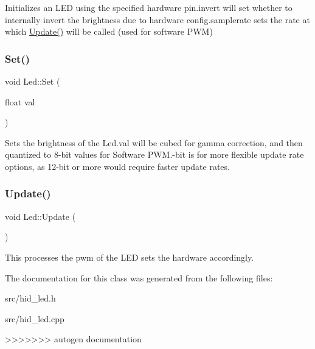 Initializes an L\+ED using the specified hardware pin.\+invert will set whether to internally invert the brightness due to hardware config.\+samplerate sets the rate at which \textquotesingle{}\hyperlink{classdaisy_1_1_led_ae8cbdb3e29cdc4f1f2aa50d7ce470fc9}{Update()}\textquotesingle{} will be called (used for software P\+WM) \mbox{\label{classdaisy_1_1_led_a007d36b37dee07e43b65789f1501b628}} 
\subsubsection{\texorpdfstring{Set()}{Set()}}
{\footnotesize\ttfamily void Led\+::\+Set (\begin{DoxyParamCaption}\item[{float}]{val }\end{DoxyParamCaption})}

Sets the brightness of the Led.\+val will be cubed for gamma correction, and then quantized to 8-\/bit values for Software P\+W\+M.-\/bit is for more flexible update rate options, as 12-\/bit or more would require faster update rates. \mbox{\label{classdaisy_1_1_led_ae8cbdb3e29cdc4f1f2aa50d7ce470fc9}} 
\subsubsection{\texorpdfstring{Update()}{Update()}}
{\footnotesize\ttfamily void Led\+::\+Update (\begin{DoxyParamCaption}{ }\end{DoxyParamCaption})}

This processes the pwm of the L\+ED sets the hardware accordingly. 

The documentation for this class was generated from the following files\+:\begin{DoxyCompactItemize}
\item 
src/hid\+\_\+led.\+h\item 
src/hid\+\_\+led.\+cpp\end{DoxyCompactItemize}
>>>>>>> autogen documentation
